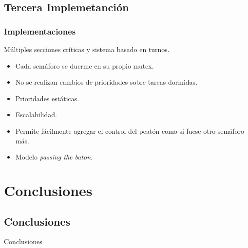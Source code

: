 \subsection{Tercera Implemetanción}
\begin{frame}
\frametitle{Implementaciones}
\begin{block}{Múltiples secciones críticas y sistema basado en turnos.}
	\begin{itemize}
		\item Cada semáforo se duerme en su propio mutex.
		\item No se realizan cambios de prioridades sobre tareas dormidas.
		\item Prioridades estáticas.
		\item Escalabilidad.
		\item Permite fácilmente agregar el control del peatón como si fuese otro semáforo más.
		\item Modelo \emph{passing the baton}.
	\end{itemize}
\end{block}
\end{frame}

\section{Conclusiones}

\subsection{Conclusiones}
\begin{frame}
	\begin{block}{Conclusiones}
	\end{block}
\end{frame}